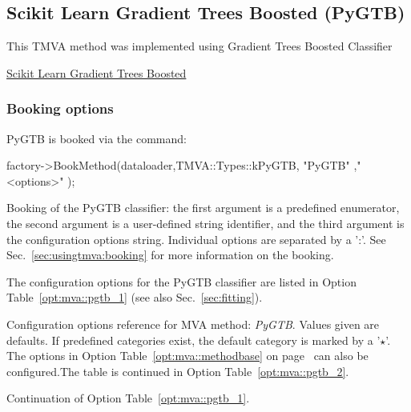 \subsection{Scikit Learn Gradient Trees Boosted (PyGTB)}
\label{sec:PyGTB}

This TMVA method was implemented using Gradient Trees Boosted Classifier 
 
\href{http://scikit-learn.org/stable/modules/ensemble.html#gradient-boosting}{Scikit Learn Gradient Trees Boosted}


\subsubsection{Booking options}

PyGTB is booked via the command:
\begin{codeexample}
\begin{tmvacode}
factory->BookMethod(dataloader,TMVA::Types::kPyGTB, "PyGTB"
,"<options>" );
\end{tmvacode}
\caption[.]{\codeexampleCaptionSize Booking of the PyGTB classifier: the first argument is 
		   a predefined enumerator, the second argument is a user-defined 
		   string identifier, and the third argument is the configuration options string.
         Individual options are separated by a ':'. 
         See Sec.~\ref{sec:usingtmva:booking} for more information on the booking.}
\end{codeexample}

The configuration options for the PyGTB classifier are listed in Option Table~\ref{opt:mva::pgtb_1}
(see also Sec.~\ref{sec:fitting}).

\begin{option}[p]

\caption[.]{\optionCaptionSize 
     Configuration options reference for MVA method: {\em PyGTB}.
     Values given are defaults. If predefined categories exist, the default category 
     is marked by a '$\star$'. The options in Option Table~\ref{opt:mva::methodbase} on 
     page~\pageref{opt:mva::methodbase} can also be configured.The table
      is continued in Option Table~\ref{opt:mva::pgtb_2}.  
}
\label{opt:mva::pgtb_1}
\end{option}

\begin{option}[p]

\caption[.]{\optionCaptionSize 
     Continuation of Option Table~\ref{opt:mva::pgtb_1}.     
}
\label{opt:mva::pgtb_2}
\end{option}


